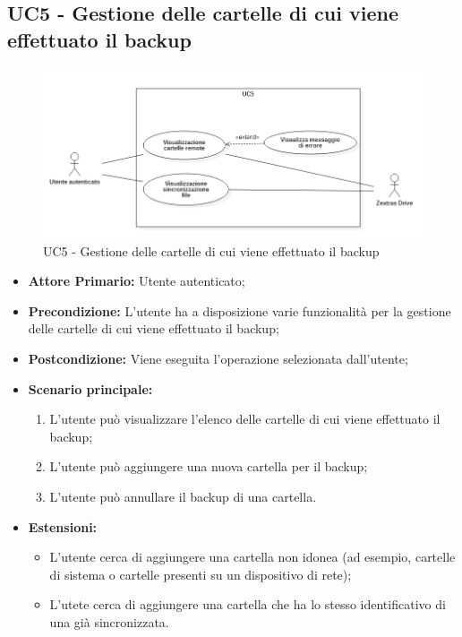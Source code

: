 \subsection{UC5 - Gestione delle cartelle di cui viene effettuato il backup}
\begin{figure}[H]
    \centering
    \includegraphics[scale = 0.7]{components/img/UC5.png}
    \caption{UC5 - Gestione delle cartelle di cui viene effettuato il backup}
\end{figure}
\begin{itemize}
\item \textbf{Attore Primario:} Utente autenticato;
\item \textbf{Precondizione:} L'utente ha a disposizione varie funzionalità per la gestione delle cartelle di cui viene effettuato il backup;
\item \textbf{Postcondizione:} Viene eseguita l'operazione selezionata dall'utente;
\item \textbf{Scenario principale:}
    \begin{enumerate}
    \item L'utente può visualizzare l'elenco delle cartelle di cui viene effettuato il backup;
    \item L'utente può aggiungere una nuova cartella per il backup;
    \item L'utente può annullare il backup di una cartella.
    \end{enumerate}
\item \textbf{Estensioni:}
\begin{itemize}
\item L'utente cerca di aggiungere una cartella non idonea (ad esempio, cartelle di sistema o cartelle presenti su un dispositivo di rete);
\item L'utete cerca di aggiungere una cartella che ha lo stesso identificativo di una già sincronizzata.
\end{itemize}
\end{itemize}